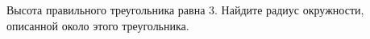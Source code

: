 \begin{ex}
	\begin{condition}
		Высота правильного треугольника равна \( 3 \). Найдите радиус окружности, описанной около этого треугольника.
	\end{condition}
\end{ex}